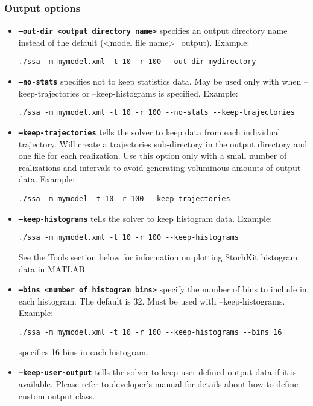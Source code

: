 \documentclass[11pt,letterpaper]{article}
\begin{document}
\subsubsection{Output options}
\begin{itemize}
    \item \texttt{\textbf{--out-dir <output directory name>}} specifies an output directory name instead of the default (<model file name>\_output).
Example:
\begin{lstlisting}
./ssa -m mymodel.xml -t 10 -r 100 --out-dir mydirectory
\end{lstlisting}
\item \texttt{\textbf{--no-stats}} specifies not to keep statistics data.  May be used only with when --keep-trajectories or --keep-histograms is specified.
Example: 
\begin{lstlisting}
./ssa -m mymodel.xml -t 10 -r 100 --no-stats --keep-trajectories
\end{lstlisting}
\item \texttt{\textbf{--keep-trajectories}} tells the solver to keep data from each individual trajectory.  Will create a trajectories sub-directory in the output directory and one file for each realization.  Use this option only with a small number of realizations and intervals to avoid generating voluminous amounts of output data.
Example: 
\begin{lstlisting}
./ssa -m mymodel -t 10 -r 100 --keep-trajectories
\end{lstlisting}
\item \texttt{\textbf{--keep-histograms}} tells the solver to keep histogram data.
Example: 
\begin{lstlisting}
./ssa -m mymodel.xml -t 10 -r 100 --keep-histograms
\end{lstlisting}
See the Tools section below for information on plotting StochKit histogram data in MATLAB.
\item \texttt{\textbf{--bins <number of histogram bins>}} specify the number of bins to include in each histogram.  The default is 32.  Must be used with --keep-histograms.
Example: 
\begin{lstlisting}
./ssa -m mymodel.xml -t 10 -r 100 --keep-histograms --bins 16
\end{lstlisting}
specifies 16 bins in each histogram.
\item \texttt{\textbf{--keep-user-output}} tells the solver to keep user defined output data if it is available. Please refer to developer's manual for details about how to define custom output class.

\end{itemize}
\end{document}
